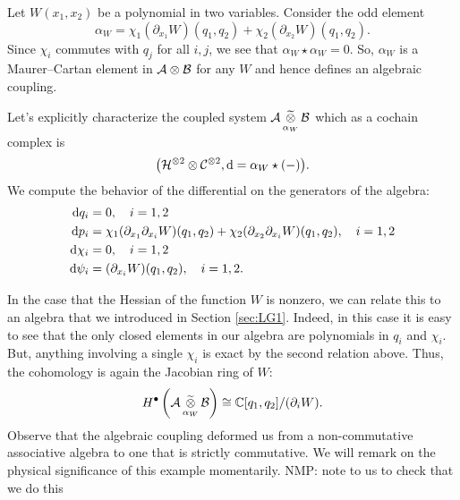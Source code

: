 \documentclass[11pt]{amsart}
\def\natalie#1{{\textcolor{green!65!black}{NMP: {#1}}}}
\begin{document}
Let $W(x_1,x_2)$ be a polynomial in two variables. 
Consider the odd element 
\[
\alpha_W = \chi_1 (\partial_{x_1} W)(q_1,q_2) + \chi_2 (\partial_{x_2} W)(q_1,q_2) .
\]
Since $\chi_i$ commutes with $q_j$ for all $i,j$, we see that $\alpha_W \star \alpha_W = 0$.
So, $\alpha_W$ is a Maurer--Cartan element in $\mathcal A \otimes \mathcal B$ for any $W$ and hence defines an algebraic coupling. 

Let's explicitly characterize the coupled system $\mathcal A \, \underset{\alpha_W}{\widetilde{\otimes}} \, \mathcal B$ which as a cochain complex is 
\[
\big(\mathcal H^{\otimes 2} \otimes \mathcal C^{\otimes 2} , {\rm d} = \alpha_W \star (-) \big) .
\]
We compute the behavior of the differential on the generators of the algebra: 
\begin{align*}
{\rm d} q_i & = 0 , \quad i=1,2 \\
{\rm d} p_i & = \chi_1 (\partial_{x_1} \partial_{x_i} W)(q_1,q_2) + \chi_2 (\partial_{x_2} \partial_{x_i} W)(q_1,q_2) , \quad i = 1,2 \\
{\rm d} \chi_i & = 0, \quad i=1,2 \\
{\rm d} \psi_i & = (\partial_{x_i} W)(q_1,q_2), \quad i=1,2 . 
\end{align*}

In the case that the Hessian of the function $W$ is nonzero, we can relate this to an algebra that we introduced in Section \ref{sec:LG1}. 
Indeed, in this case it is easy to see that the only closed elements in our algebra are polynomials in $q_i$ and $\chi_i$. 
But, anything involving a single $\chi_i$ is exact by the second relation above. 
Thus, the cohomology is again the Jacobian ring of $W$:
\[
H^\bullet \left(\mathcal A \, \underset{\alpha_W}{\widetilde{\otimes}} \, \mathcal B\right) \cong \mathbb C[q_1,q_2] / (\partial_i W)  .
\]
Observe that the algebraic coupling deformed us from a non-commutative associative algebra to one that is strictly commutative. 
We will remark on the physical significance of this example momentarily. \natalie{note to us to check that we do this}
%

%
\end{document}
